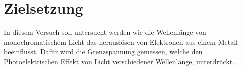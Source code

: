 \section{Zielsetzung}
In diesem Versuch soll untersucht werden wie die Wellenlänge von monochromatischem Licht das herauslösen von Elektronen aus einem Metall beeinflusst.
Dafür wird die Grenzspannung gemessen, welche den Photoelektrischen Effekt von Licht verschiedener Wellenlänge, unterdrückt.
